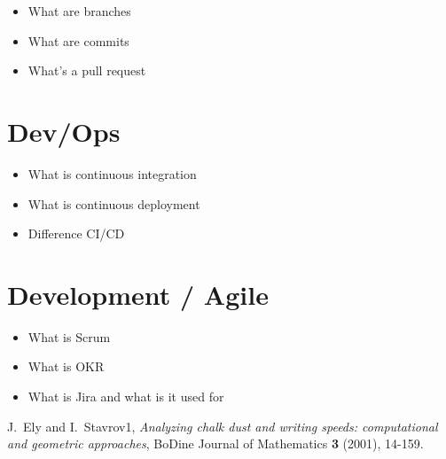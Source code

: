 \documentclass[12pt, numbers=noenddot]{scrreprt} %
\begin{document}
\begin{itemize}
\item What are branches
\item What are commits
\item What's a pull request
\end{itemize}

\section*{Dev/Ops}

\begin{itemize}
\item What is continuous integration
\item What is continuous deployment
\item Difference CI/CD
\end{itemize}

\section*{Development / Agile}

\begin{itemize}
\item What is Scrum
\item What is OKR
\item What is Jira and what is it used for
\end{itemize}


\newpage

\begin{thebibliography}{99}

J.~Ely and I.~Stavrov1,
\emph{Analyzing chalk dust and writing speeds: computational and geometric approaches},
BoDine Journal of Mathematics \textbf{3} (2001), 14-159.

\end{thebibliography}


\listoffigures%
\listoftables%
\end{document}
